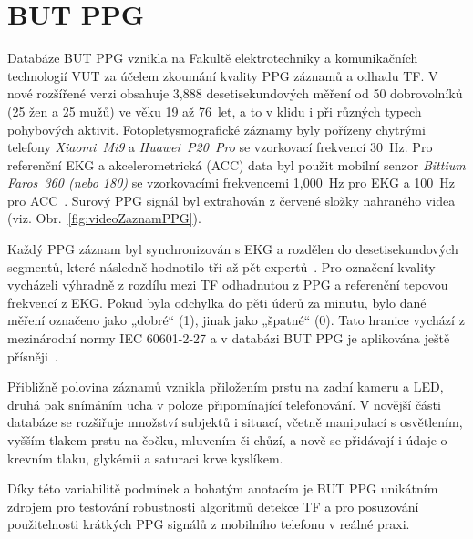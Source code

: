 \section{\acs{BUT PPG}}
\label{sec:but_ppg}
Databáze \acs{BUT PPG} vznikla na Fakultě elektrotechniky a komunikačních technologií \acs{VUT} za účelem zkoumání kvality \acs{PPG} záznamů a odhadu \acs{TF}.
V nové rozšířené verzi obsahuje 3,888 desetisekundových měření od 50 dobrovolníků (25 žen a 25 mužů) ve věku 19 až 76~let, a to v klidu i při různých typech pohybových aktivit.
Fotopletysmografické záznamy byly pořízeny chytrými telefony \textit{Xiaomi~Mi9} a \textit{Huawei~P20~Pro} se vzorkovací frekvencí 30~Hz.
Pro referenční \acs{EKG} a akcelerometrická (\acs{ACC}) data byl použit mobilní senzor \textit{Bittium Faros~360 (nebo 180)} se vzorkovacími frekvencemi 1,000~Hz pro \acs{EKG} a 100~Hz pro \acs{ACC}~\cite{BUT_PPG,BUT_PPG_database}.
Surový \acs{PPG} signál byl extrahován z červené složky nahraného videa (viz. Obr.~\ref{fig:videoZaznamPPG}).

Každý \acs{PPG} záznam byl synchronizován s \acs{EKG} a rozdělen do desetisekundových segmentů, které následně hodnotilo tři až pět expertů~\cite{BUT_PPG_database}.
Pro označení kvality vycházeli výhradně z rozdílu mezi \acs{TF} odhadnutou z \acs{PPG} a referenční tepovou frekvencí z \acs{EKG}.
Pokud byla odchylka do pěti úderů za minutu, bylo dané měření označeno jako „dobré“ (1), jinak jako „špatné“ (0).
Tato hranice vychází z mezinárodní normy IEC 60601-2-27 a v databázi \acs{BUT PPG} je aplikována ještě přísněji~\cite{BUT_PPG}.

Přibližně polovina záznamů vznikla přiložením prstu na zadní kameru a \acs{LED}, druhá pak snímáním ucha v poloze připomínající telefonování.
V novější části databáze se rozšiřuje množství subjektů i situací, včetně manipulací s osvětlením, vyšším tlakem prstu na čočku, mluvením či chůzí, a nově se přidávají i údaje o krevním tlaku, glykémii a saturaci krve kyslíkem.

Díky této variabilitě podmínek a bohatým anotacím je \acs{BUT PPG} unikátním zdrojem pro testování robustnosti algoritmů detekce \acs{TF} a pro posuzování použitelnosti krátkých \acs{PPG} signálů z mobilního telefonu v reálné praxi.

